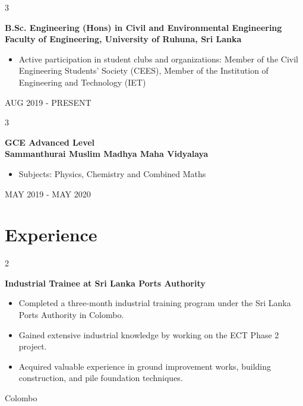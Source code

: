 \documentclass[10pt, letterpaper]{article}
\newenvironment{highlights}{
    \begin{itemize}[
        topsep=0.10 cm,
        parsep=0.10 cm,
        partopsep=0pt,
        itemsep=0pt,
        leftmargin=0.4 cm + 10pt
    ]
}{
    \end{itemize}
} %
\newenvironment{twocolentry}[2][]{
    \onecolentry
    \def\secondColumn{#2}
    \setcolumnwidth{\fill, 4.5 cm}
    \begin{paracol}{2}
    }{
    \switchcolumn \raggedleft \secondColumn
    \end{paracol}
    \endonecolentry
} %
\newenvironment{threecolentry}[3][]{
    \onecolentry
    \def\thirdColumn{#3}
    \setcolumnwidth{0 cm, \fill, 4.5 cm}
    \begin{paracol}{3}
    {\raggedright #2} \switchcolumn
    }{
    \switchcolumn \raggedleft \thirdColumn
    \end{paracol}
    \endonecolentry
} %
\begin{document}
        
        \begin{threecolentry}{\textbf{}}{
            AUG 2019 - PRESENT
        }
            \textbf{B.Sc. Engineering (Hons) in Civil and Environmental Engineering \\Faculty of Engineering, University of Ruhuna, Sri Lanka}
            \begin{highlights}
                \item Active participation in student clubs and organizations: Member of the Civil Engineering Students' Society (CEES), Member of the Institution of Engineering and Technology (IET)
            \end{highlights}
        \end{threecolentry}


        \vspace{0.2 cm}

        \begin{threecolentry}{\textbf{}}{
            MAY 2019 - MAY 2020
        }
            \textbf{GCE Advanced Level\\Sammanthurai Muslim Madhya Maha Vidyalaya}
            \begin{highlights}
                \item Subjects: Physics, Chemistry and Combined Maths
            \end{highlights}
        \end{threecolentry}



    
\section{Experience}

\begin{twocolentry}{
    Colombo
}
    \textbf{Industrial Trainee at Sri Lanka Ports Authority}
    \begin{highlights}
        \item Completed a three-month industrial training program under the Sri Lanka Ports Authority in Colombo.
        \item Gained extensive industrial knowledge by working on the ECT Phase 2 project.
        \item Acquired valuable experience in ground improvement works, building construction, and pile foundation techniques.
    \end{highlights}
\end{twocolentry}
\end{document}
